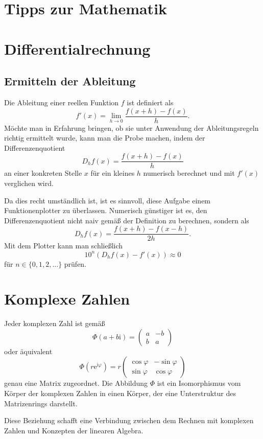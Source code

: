 \documentclass[a4paper,10pt,fleqn,twocolumn,twoside,dvipdfmx]{scrartcl}
\newcommand{\ee}{\mathrm{e}}
\newcommand{\ui}{\mathrm{i}}
\begin{document}
\section*{\LARGE Tipps zur Mathematik}

\tableofcontents

\section{Differentialrechnung}

\subsection{Ermitteln der Ableitung}

Die Ableitung einer reellen Funktion $f$ ist definiert als%
\[f'(x) = \lim_{h\to 0}\frac{f(x+h)-f(x)}{h}.\]
Möchte man in Erfahrung bringen, ob sie unter Anwendung
der Ableitungsregeln richtig ermittelt wurde, kann man die Probe
machen, indem der Differenzenquotient%
\[D_h f(x) = \frac{f(x+h)-f(x)}{h}\]
an einer konkreten Stelle $x$ für ein kleines $h$ numerisch
berechnet und mit $f'(x)$ verglichen wird.

Da dies recht umständlich ist, ist es sinnvoll, diese Aufgabe einem
Funktionenplotter zu überlassen. Numerisch günstiger ist es, den
Differenzenquotient nicht naiv gemäß der Definition zu berechnen,
sondern als%
\[D_h f(x) = \frac{f(x+h)-f(x-h)}{2h}.\]
Mit dem Plotter kann man schließlich
\[10^n (D_h f(x) - f'(x)) \approx 0\]
für $n\in\{0,1,2,\ldots\}$ prüfen.

\section{Komplexe Zahlen}

Jeder komplexen Zahl ist gemäß
\[\Phi(a+b\ui) = \begin{pmatrix}a & -b\\ b & a\end{pmatrix}\]
oder äquivalent
\[\Phi(r\ee^{\ui\varphi}) = r\begin{pmatrix}
\cos\varphi & -\sin\varphi\\
\sin\varphi & \cos\varphi
\end{pmatrix}\]
genau eine Matrix zugeordnet. Die Abbildung $\Phi$ ist ein
Isomorphismus vom Körper der komplexen Zahlen in einen Körper,
der eine Unterstruktur des Matrizenrings darstellt.

Diese Beziehung schafft eine Verbindung zwischen dem
Rechnen mit komplexen Zahlen und Konzepten der linearen Algebra.
\end{document}
